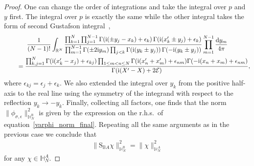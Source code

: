 \begin{proof}
One can change the order of integrations and take the integral over $p$ and $y$ first. The integral over $p$ is exactly the same while the
other integral takes the form of second Gustafson integral~\cite[Theorem 9.3]{MR1139492},
\begin{gather*}
\frac1{(N-1)!}\int_{\mathbb R^N}\frac{\prod_{k=1}^N\prod_{j=1}^{N-1} \Gamma({\rm i}(\pm y_j- x_k)+\epsilon_k)\,\Gamma({\rm i}( x'_k\pm y_j)+\epsilon_k)}
{\prod_{m=1}^{N-1}\Gamma(\pm 2{\rm i} y_m) \prod_{j < k}\Gamma({\rm i}(y_k \pm y_j))\,\Gamma(-{\rm i}(y_k\pm y_j))}
\prod_{m=1}^{N-1} \frac{{\rm d}y_m}{4\pi}
\\ \qquad
{}=\frac{\prod_{k,j=1}^{N} \Gamma({\rm i}(x'_k-x_j)+\epsilon_{kj})\prod_{1\leq m<n\leq N}
\Gamma({\rm i}(x'_n+x'_m)+\epsilon_{nm}) \Gamma(-{\rm i}(x_n+x_m)+\epsilon_{nm})
 }{\Gamma({\rm i}(X'-X)+2\mathcal E)},
\end{gather*}
where $\epsilon_{kj}=\epsilon_j+\epsilon_k$.
We also extended the integral over $y_k$ from the positive half-axis to the real line using
the symmetry of the integrand with respect to the reflection $y_k\to -y_k$. Finally, collecting all factors, one finds that the norm
$\|\phi_{\sigma,\epsilon}\|^2_{\mathbb H_N^{\mathbb B}}$ is given by the expression on the r.h.s.\ of equation~\eqref{varphi_norm_final}.
Repeating all the same arguments as in the previous case we conclude that{\samepage
\begin{gather*}
\|\mathrm S_{\mathbb B A}\chi\|^2_{\mathbb H_N^{\mathbb B}}=\|\chi\|^2_{\mathbb H_{N}^A}
\end{gather*}
for any $\chi\in\mathbb H_{N}^A$.}



\end{proof}
